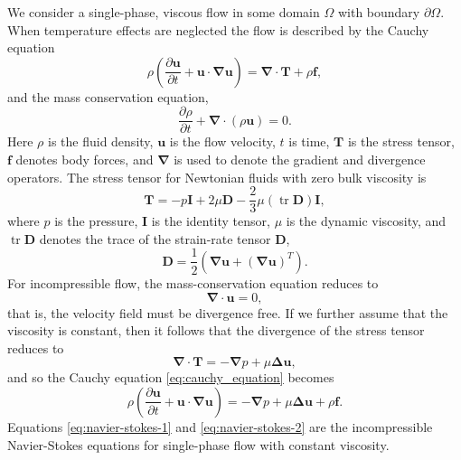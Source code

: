 \documentclass[11pt,b5paper,DIV=calc,BCOR1.3cm,headings=small,%
               footinclude=false,headsepline]{scrbook}
\newcommand*{\cd}[1]{\ensuremath{\pdt{#1} + \vct u\cdot\grad #1}}
\newcommand*{\pdt}[1]{\ensuremath{\frac{\partial #1}{\partial t}}}
\newcommand*{\vct}[1]{\ensuremath{\boldsymbol{#1}}}
\newcommand*{\del}{\boldsymbol\nabla}
\renewcommand*{\div}{\del\cdot}
\newcommand*{\grad}{\del}
\newcommand*{\lapl}{\boldsymbol\Delta}
\newcommand*{\tenstr}{\vct T}
\newcommand*{\tenI}{\vct I}
\newcommand*{\tenD}{\vct D}
\DeclareMathOperator\trace{tr}
\begin{document}
We consider a single-phase, viscous flow in some domain $\Omega$ with boundary
$\partial\Omega$.  When temperature effects are neglected the flow is described
by the Cauchy equation
\begin{equation}
  \label{eq:cauchy_equation}
  \rho\left(\cd{\vct u}\right) = \div\tenstr+\rho\vct f,
\end{equation}
and the mass conservation equation,
\begin{equation}
  \label{eq:cons_of_mass}
  \pdt\rho + \div(\rho\vct u) = 0.
\end{equation}
Here $\rho$ is the fluid density, $\vct u$ is the flow velocity, $t$ is time,
$\tenstr$ is the stress tensor, $\vct f$ denotes body forces, and $\del$ is
used to denote the gradient and divergence operators.  The stress tensor for
Newtonian fluids with zero bulk viscosity is
\begin{equation}
  \tenstr = -p\tenI + 2\mu\tenD - \frac 2 3\mu (\trace\tenD) \tenI,
  \label{eq:viscous_stress_tensor}
\end{equation}
where $p$ is the pressure, $\tenI$ is the identity tensor, $\mu$ is the dynamic
viscosity, and $\trace\tenD$ denotes the trace of the strain-rate tensor
$\tenD$,
\begin{equation}
  \tenD = \frac{1}{2}\left( \grad\vct u + (\grad\vct u)^T \right).
  \label{eq:deformation_tensor}
\end{equation}
For incompressible flow, the mass-conservation equation reduces to
\begin{equation}
  \label{eq:navier-stokes-1}
  \div\vct u = 0,
\end{equation}
that is, the velocity field must be divergence free.  If we further assume that
the viscosity is constant, then it follows that the divergence of the stress
tensor reduces to
\begin{equation}
  \label{eq:stress_tensor}
  \div\tenstr = -\grad p + \mu\lapl\vct u,
\end{equation}
and so the Cauchy equation \eqref{eq:cauchy_equation} becomes
\begin{equation}
  \rho\left(\cd{\vct u}\right) = -\grad p + \mu\lapl\vct u + \rho\vct f.
  \label{eq:navier-stokes-2}
\end{equation}
Equations \eqref{eq:navier-stokes-1} and \eqref{eq:navier-stokes-2} are the
incompressible Navier-Stokes equations for single-phase flow with constant
viscosity.
\end{document}
